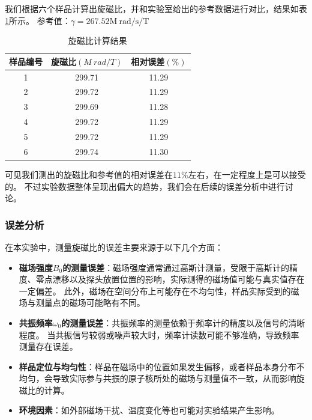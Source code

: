\documentclass[12pt,a4paper,UTF8]{ctexart}
\begin{document}
我们根据六个样品计算出旋磁比，并和实验室给出的参考数据进行对比，结果如表\ref{tab:gamma}所示。
参考值：$\gamma = 267.52\mathrm{M~rad/s/T}$

\begin{table}[h!]
    \centering
    \begin{tabular}{|c|c|c|}
        \hline
        样品编号 & 旋磁比$(M~rad/T)$ & 相对误差$(\%)$ \\
        \hline\hline
        1 & 299.71 & 11.29 \\
        2 & 299.72 & 11.29 \\
        3 & 299.69 & 11.28 \\
        4 & 299.72 & 11.29 \\
        5 & 299.72 & 11.29 \\
        6 & 299.74 & 11.30 \\
        \hline
    \end{tabular}
    \caption{旋磁比计算结果}
    \label{tab:gamma}
\end{table}

可见我们测出的旋磁比和参考值的相对误差在$11\%$左右，在一定程度上是可以接受的。
不过实验数据整体呈现出偏大的趋势，我们会在后续的误差分析中进行讨论。

\subsubsection*{误差分析}
在本实验中，测量旋磁比的误差主要来源于以下几个方面：
\begin{itemize}
    \item \textbf{磁场强度$B_0$的测量误差}：磁场强度通常通过高斯计测量，受限于高斯计的精度、零点漂移以及探头放置位置的影响，实际测得的磁场值可能与真实值存在一定偏差。
    此外，磁场在空间分布上可能存在不均匀性，样品实际受到的磁场与测量点的磁场可能略有不同。

    \item \textbf{共振频率$\omega_0$的测量误差}：共振频率的测量依赖于频率计的精度以及信号的清晰程度。
    当共振信号较弱或噪声较大时，频率计读数可能不够准确，导致频率测量存在误差。

    \item \textbf{样品定位与均匀性}：样品在磁场中的位置如果发生偏移，或者样品本身分布不均匀，会导致实际参与共振的原子核所处的磁场与测量值不一致，从而影响旋磁比的计算。
    
    \item \textbf{环境因素}：如外部磁场干扰、温度变化等也可能对实验结果产生影响。
\end{itemize}
\end{document}
